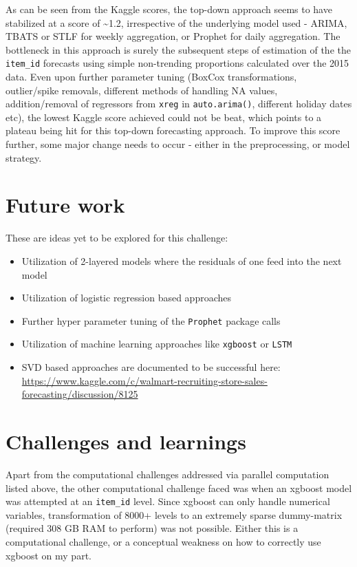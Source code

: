\documentclass[floatsintext,man]{apa6}
\providecommand{\tightlist}{%
  \setlength{\itemsep}{0pt}\setlength{\parskip}{0pt}}
\theoremstyle{definition}
\theoremstyle{definition}
\theoremstyle{definition}
\theoremstyle{remark}
\begin{document}
As can be seen from the Kaggle scores, the top-down approach seems to
have stabilized at a score of \textasciitilde{}1.2, irrespective of the
underlying model used - ARIMA, TBATS or STLF for weekly aggregation, or
Prophet for daily aggregation. The bottleneck in this approach is surely
the subsequent steps of estimation of the the \texttt{item\_id}
forecasts using simple non-trending proportions calculated over the 2015
data. Even upon further parameter tuning (BoxCox transformations,
outlier/spike removals, different methods of handling NA values,
addition/removal of regressors from \texttt{xreg} in
\texttt{auto.arima()}, different holiday dates etc), the lowest Kaggle
score achieved could not be beat, which points to a plateau being hit
for this top-down forecasting approach. To improve this score further,
some major change needs to occur - either in the preprocessing, or model
strategy.

\section{Future work}\label{future-work}

These are ideas yet to be explored for this challenge:

\begin{itemize}
\tightlist
\item
  Utilization of 2-layered models where the residuals of one feed into
  the next model
\item
  Utilization of logistic regression based approaches
\item
  Further hyper parameter tuning of the \texttt{Prophet} package calls
\item
  Utilization of machine learning approaches like \texttt{xgboost} or
  \texttt{LSTM}
\item
  SVD based approaches are documented to be successful here:
  \url{https://www.kaggle.com/c/walmart-recruiting-store-sales-forecasting/discussion/8125}
\end{itemize}

\section{Challenges and learnings}\label{challenges-and-learnings}

Apart from the computational challenges addressed via parallel
computation listed above, the other computational challenge faced was
when an xgboost model was attempted at an \texttt{item\_id} level. Since
xgboost can only handle numerical variables, transformation of 8000+
levels to an extremely sparse dummy-matrix (required 308 GB RAM to
perform) was not possible. Either this is a computational challenge, or
a conceptual weakness on how to correctly use xgboost on my part.
\end{document}
